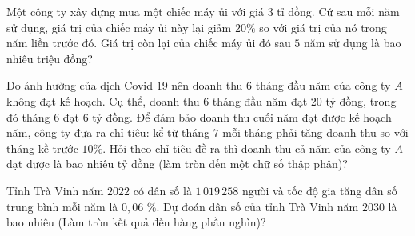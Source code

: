 \begin{ex}%
	Một công ty xây dựng mua một chiếc máy ủi với giá  $3$ tỉ đồng. Cứ sau mỗi năm sử dụng, giá trị của chiếc máy ủi này lại giảm $20 \%$ so với giá trị của nó trong năm liền trước đó. Giá trị còn lại của chiếc máy ủi đó sau $5$ năm sử dụng là bao nhiêu triệu đồng?
\end{ex}

\begin{ex}%
	Do ảnh hưởng của dịch Covid $19$ nên doanh  thu $6$ tháng đầu năm của công ty $A$ không đạt kế hoạch. Cụ thể, doanh thu $6$ tháng đầu năm đạt $20$ tỷ đồng, trong đó tháng $6$ đạt $ 6$ tỷ đồng. Để đảm bảo doanh thu cuối năm đạt được kế hoạch năm, công ty đưa ra chỉ tiêu: kể từ tháng $7$ mỗi tháng phải tăng doanh thu so với tháng kề trước $10 \%$. Hỏi theo chỉ tiêu đề ra thì doanh thu cả năm của công ty $A$ đạt được là bao nhiêu tỷ đồng (làm tròn đến một chữ số thập phân)?
\end{ex}

\begin{ex}%
	Tỉnh Trà Vinh năm $2022$ có dân số là $1\,019\,258$ người  và tốc độ gia tăng dân số trung bình mỗi năm là $0{,}06$ \%. Dự đoán dân số của tỉnh Trà Vinh năm $2030$ là bao nhiêu (Làm tròn kết quả đến hàng phần nghìn)?
\end{ex}

